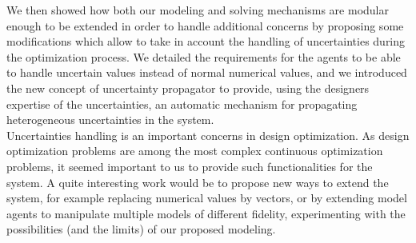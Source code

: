 We then showed how both our modeling and solving mechanisms are modular enough to be extended in order to handle additional concerns by proposing some modifications which allow to take in account the handling of uncertainties during the optimization process. We detailed the requirements for the agents to be able to handle uncertain values instead of normal numerical values, and we introduced the new concept of uncertainty propagator to provide, using the designers expertise of the uncertainties, an automatic mechanism for propagating heterogeneous uncertainties in the system.
\\
Uncertainties handling is an important concerns in design optimization. As design optimization problems are among the most complex continuous optimization problems, it seemed important to us to provide such functionalities for the system. A quite interesting work would be to propose new ways to extend the system, for example replacing numerical values by vectors, or by extending model agents to manipulate multiple models of different fidelity, experimenting with the possibilities (and the limits) of our proposed modeling.
